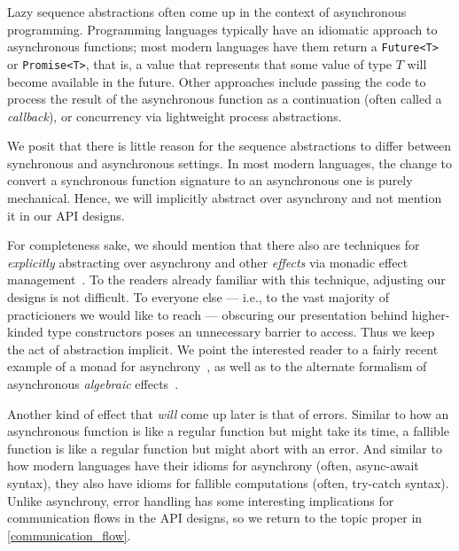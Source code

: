 \documentclass[sigplan,screen,10pt,review]{acmart}
\begin{document}

Lazy sequence abstractions often come up in the context of asynchronous programming. Programming languages typically have an idiomatic approach to asynchronous functions; most modern languages have them return a \texttt{Future<T>} or \texttt{Promise<T>}, that is, a value that represents that some value of type $T$ will become available in the future. Other approaches include passing the code to process the result of the asynchronous function as a continuation (often called a \textit{callback}), or concurrency via lightweight process abstractions.

We posit that there is little reason for the sequence abstractions to differ between synchronous and asynchronous settings. In most modern languages, the change to convert a synchronous function signature to an asynchronous one is purely mechanical. Hence, we will implicitly abstract over asynchrony and not mention it in our API designs.

For completeness sake, we should mention that there also are techniques for \textit{explicitly} abstracting over asynchrony and other \textit{effects} via monadic effect management~\cite{wadler1995monads}. To the readers already familiar with this technique, adjusting our designs is not difficult. To everyone else --- i.e., to the vast majority of practicioners we would like to reach --- obscuring our presentation behind higher-kinded type constructors poses an unnecessary barrier to access. Thus we keep the act of abstraction implicit. We point the interested reader to a fairly recent example of a monad for asynchrony~\cite{zhao2020asynchronous}, as well as to the alternate formalism of asynchronous \textit{algebraic} effects~\cite{leijen2017structured}\cite{ahman2021asynchronous}.

Another kind of effect that \textit{will} come up later is that of errors. Similar to how an asynchronous function is like a regular function but might take its time, a fallible function is like a regular function but might abort with an error. And similar to how modern languages have their idioms for asynchrony (often, async-await syntax), they also have idioms for fallible computations (often, try-catch syntax). Unlike asynchrony, error handling has some interesting implications for communication flows in the API designs, so we return to the topic proper in \cref{communication_flow}.
\end{document}
